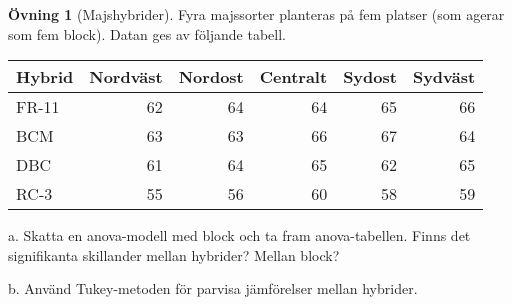 \documentclass[
]{book}
\theoremstyle{definition}
\theoremstyle{definition}
\theoremstyle{definition}
\newtheorem{exercise}{Övning}[chapter]
\theoremstyle{definition}
\theoremstyle{remark}
\begin{document}
\begin{exercise}[Majshybrider]
Fyra majssorter planteras på fem platser (som agerar som fem block). Datan ges av följande tabell.

\begin{table}
\centering
\begin{tabular}[t]{lrrrrr}
\toprule
Hybrid & Nordväst & Nordost & Centralt & Sydost & Sydväst\\
\midrule
FR-11 & 62 & 64 & 64 & 65 & 66\\
BCM & 63 & 63 & 66 & 67 & 64\\
DBC & 61 & 64 & 65 & 62 & 65\\
RC-3 & 55 & 56 & 60 & 58 & 59\\
\bottomrule
\end{tabular}
\end{table}

a. Skatta en anova-modell med block och ta fram anova-tabellen. Finns det signifikanta skillander mellan hybrider? Mellan block?

b. Använd Tukey-metoden för parvisa jämförelser mellan hybrider.
\end{exercise}
\end{document}
